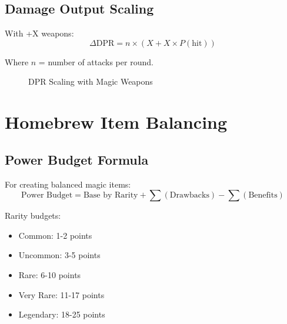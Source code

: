 \documentclass[11pt,letterpaper,openany]{book}
\begin{document}
\subsection{Damage Output Scaling}

With +X weapons:
\begin{equation}
\Delta\text{DPR} = n \times \left(X + X \times P(\text{hit})\right)
\end{equation}

Where $n$ = number of attacks per round.

\begin{figure}[h]
\centering
{}
\caption{DPR Scaling with Magic Weapons}
\end{figure}

\section{Homebrew Item Balancing}

\subsection{Power Budget Formula}

For creating balanced magic items:
\begin{equation}
\text{Power Budget} = \text{Base by Rarity} + \sum(\text{Drawbacks}) - \sum(\text{Benefits})
\end{equation}

Rarity budgets:
\begin{itemize}
    \item Common: 1-2 points
    \item Uncommon: 3-5 points
    \item Rare: 6-10 points
    \item Very Rare: 11-17 points
    \item Legendary: 18-25 points
\end{itemize}
\end{document}

